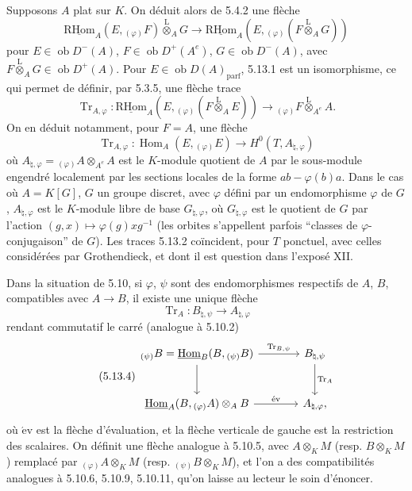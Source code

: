 \documentclass[11pt]{article}
\DeclareMathOperator{\Hom}{Hom}
\newcommand{\R}{\mathrm{R}}\newcommand{\RHomCore}{\mathrm{RHom}}
\newcommand{\ob}{\operatorname{ob}}
\providecommand{\RHom}{\RHomCore}
\providecommand{\uRHom}{\underline{\RHom}}
\providecommand{\uHom}{\underline{\Hom}}
\providecommand{\Tr}{\operatorname{Tr}}
\providecommand{\Tr}{\operatorname{Tr}}
\providecommand{\lten}{\overset{\mathrm L}{\otimes}}
\providecommand{\Tr}{\operatorname{Tr}}
\providecommand{\RHom}{\RHomCore}
\providecommand{\Hom}{\operatorname{Hom}}
\providecommand{\ob}{\operatorname{ob}}
\providecommand{\lten}{\overset{\mathrm L}{\otimes}}
\providecommand{\RHom}{\R\mathcal{H}om}
\providecommand{\lten}{\overset{\mathrm L}{\otimes}}
\providecommand{\R}{\mathrm R}
\providecommand{\Tr}{\operatorname{Tr}}
\providecommand{\lten}{\overset{\mathrm L}{\otimes}}
\providecommand{\lten}{\overset{\mathrm L}{\otimes}}
\providecommand{\lten}{\overset{\mathrm L}{\otimes}}
\providecommand{\RHom}{\RHomCore}
\providecommand{\Hom}{\operatorname{Hom}}
\providecommand{\Tr}{\operatorname{Tr}}
\providecommand{\lten}{\overset{\mathrm L}{\otimes}}
\begin{document}
Supposons $A$ plat sur $K$. On déduit alors de 5.4.2 une flèche
\begin{equation}\tag{5.13.1}
\uRHom_A(E,{}_{(\varphi)}F)\lten_AG\longrightarrow\uRHom_A(E,{}_{(\varphi)}(F\lten_AG))
\end{equation}
pour $E\in\ob D^-(A)$, $F\in\ob D^+(A^e)$, $G\in\ob D^-(A)$, avec $F\lten_AG\in\ob D^+(A)$. Pour $E\in\ob D(A)_{\mathrm{parf}}$, 5.13.1 est un isomorphisme, ce qui permet de définir, par 5.3.5, une flèche trace
\begin{equation}\tag{5.13.2}
\Tr_{A,\varphi}:\uRHom_A(E,{}_{(\varphi)}(F\lten_AE))\longrightarrow {}_{(\varphi)}F\lten_{A^e}A.
\end{equation}
On en déduit notamment, pour $F=A$, une flèche
\begin{equation}\tag{5.13.3}
\Tr_{A,\varphi}:\Hom_A(E,{}_{(\varphi)}E)\longrightarrow H^0(T,A_{\natural,\varphi})
\end{equation}
où $A_{\natural,\varphi}={}_{(\varphi)}A\otimes_{A^e}A$ est le $K$-module quotient de $A$ par le sous-module engendré localement par les sections locales de la forme $ab-\varphi(b)a$. Dans le cas où $A=K[G]$, $G$ un groupe discret, avec $\varphi$ défini par un endomorphisme $\varphi$ de $G$, $A_{\natural,\varphi}$ est le $K$-module libre de base $G_{\natural,\varphi}$, où $G_{\natural,\varphi}$ est le quotient de $G$ par l'action $(g,x)\mapsto\varphi(g)xg^{-1}$ (les orbites s'appellent parfois ``classes de $\varphi$-conjugaison'' de $G$). Les traces 5.13.2 coïncident, pour $T$ ponctuel, avec celles considérées par Grothendieck, et dont il est question dans l'exposé XII.

Dans la situation de 5.10, si $\varphi$, $\psi$ sont des endomorphismes respectifs de $A$, $B$, compatibles avec $A\to B$, il existe une unique flèche
\[
\Tr_A:B_{\natural,\psi}\longrightarrow A_{\natural,\varphi}
\]
rendant commutatif le carré (analogue à 5.10.2)
\begin{equation}\tag{5.13.4}
\begin{tikzcd}[column sep=large,row sep=large]
{}_{(\psi)}B=\uHom_B(B,{}_{(\psi)}B) \arrow[r,"\Tr_{B,\psi}"] \arrow[d] & B_{\natural,\psi} \arrow[d,"\Tr_A"]\\
\uHom_A(B,{}_{(\varphi)}A)\otimes_AB \arrow[r,"\mathrm{\acute{e}v}"] & A_{\natural,\varphi},
\end{tikzcd}
\end{equation}
où $\mathrm{\acute{e}v}$ est la flèche d'évaluation, et la flèche verticale de gauche est la restriction des scalaires. On définit une flèche analogue à 5.10.5, avec $A\otimes_KM$ (resp. 
$B\otimes_KM$)
remplacé par ${}_{(\varphi)}A\otimes_KM$ (resp. ${}_{(\psi)}B\otimes_KM$), et l'on a des compatibilités analogues à 5.10.6, 5.10.9, 5.10.11, qu'on laisse au lecteur le soin d'énoncer.
\end{document}
